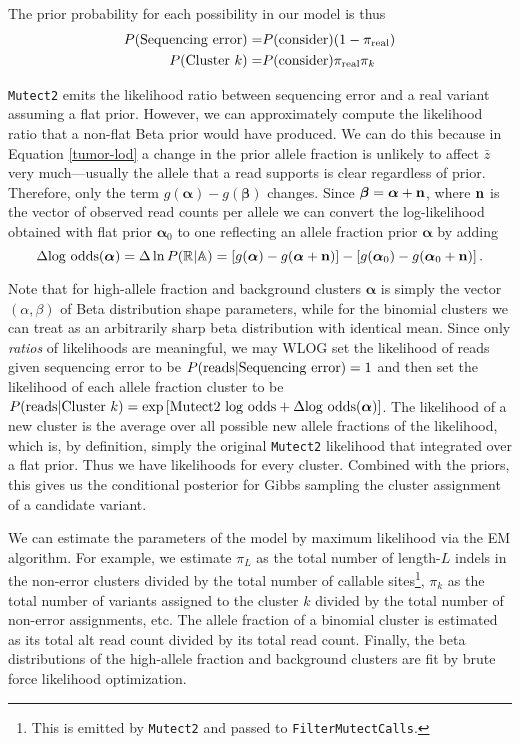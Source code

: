 \documentclass[nofootinbib,amssymb,amsmath]{revtex4}
\newcommand{\vn}{{\bf n}}
\newcommand{\valpha}{{\bm{\alpha}}}
\newcommand{\vbeta}{{\bm{\beta}}}
\newcommand{\code}[1]{\texttt{#1}}
\begin{document}
The prior probability for each possibility in our model is thus
\begin{align}
P({\rm Sequencing~error}) =& P({\rm consider}) (1 - \pi_{\rm real}) \\
P({\rm Cluster~}k) =& P({\rm consider}) \pi_{\rm real} \pi_k 
\end{align}

\code{Mutect2} emits the likelihood ratio between sequencing error and a real variant assuming a flat prior.  However, we can approximately compute the likelihood ratio that a non-flat Beta prior would have produced.  We can do this because in Equation \ref{tumor-lod} a change in the prior allele fraction is unlikely to affect $\bar{z}$ very much---usually the allele that a read supports is clear regardless of prior.  Therefore, only the term $g(\valpha) - g(\vbeta)$ changes.  Since $\vbeta = \valpha + \vn$, where $\vn$ is the vector of observed read counts per allele we can convert the log-likelihood obtained with flat prior $\valpha_0$ to one reflecting an allele fraction prior $\valpha$ by adding
\begin{equation}
\Delta {\rm log~odds}(\valpha) = \Delta \ln P(\mathbb{R} | \mathbb{A}) = \left[ g(\valpha) - g(\valpha + \vn) \right] - \left[ g(\valpha_0) - g(\valpha_0 + \vn) \right].
\end{equation}

Note that for high-allele fraction and background clusters $\valpha$ is simply the vector $(\alpha, \beta)$ of Beta distribution shape parameters, while for the binomial clusters we can treat as an arbitrarily sharp beta distribution with identical mean.  Since only \textit{ratios} of likelihoods are meaningful, we may WLOG set the likelihood of reads given sequencing error to be $P({\rm reads}|{\rm Sequencing~error}) = 1$ and then set the likelihood of each allele fraction cluster to be $P({\rm reads}|{\rm Cluster~}k)  = \exp \left[ {\rm Mutect2~log~odds} + \Delta {\rm log~odds}(\valpha) \right]$.  The likelihood of a new cluster is the average over all possible new allele fractions of the likelihood, which is, by definition, simply the original \code{Mutect2} likelihood that integrated over a flat prior.  Thus we have likelihoods for every cluster.  Combined with the priors, this gives us the conditional posterior for Gibbs sampling the cluster assignment of a candidate variant.

We can estimate the parameters of the model by maximum likelihood via the EM algorithm.  For example, we estimate $\pi_L$ as the total number of length-$L$ indels in the non-error clusters divided by the total number of callable sites\footnote{This is emitted by \code{Mutect2} and passed to \code{FilterMutectCalls}.}, $\pi_k$ as the total number of variants assigned to the cluster $k$ divided by the total number of non-error assignments, etc.  The allele fraction of a binomial cluster is estimated as its total alt read count divided by its total read count.  Finally, the beta distributions of the high-allele fraction and background clusters are fit by brute force likelihood optimization.
\end{document}
